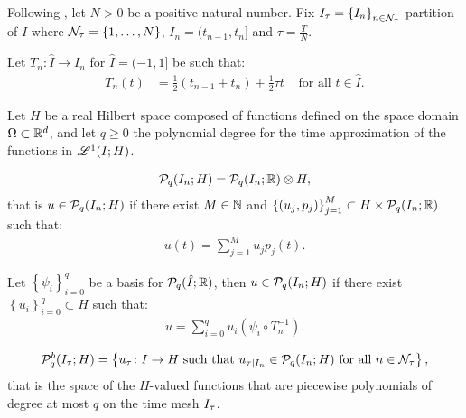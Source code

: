 Following \cite[p.~177]{Ern2021}, let $N > 0$ be a positive natural number. Fix $I_{\tau} = \left\{ I_n \right\}_{n \in \mathcal{N}_{\tau}}$ partition of $I$ where $\mathcal{N}_{\tau} = \left\{ 1, \dots, N \right\}$, $I_n = (t_{n - 1}, t_n]$ and $\tau = \frac{T}{N}$.

\begin{definition}[Mapping]
    Let $T_n \colon \hat{I} \rightarrow I_n$ for $\hat{I} = (-1, 1]$ be such that:
    \begin{align}
        T_n(t) &= \frac{1}{2}(t_{n - 1} + t_n) + \frac{1}{2} \tau t &\text{ for all } t \in \hat{I}.
    \end{align}
\end{definition}

Let $H$ be a real Hilbert space composed of functions defined on the space domain $\Omega \subset \mathbb{R}^{d}$, and let $q \geq 0$ the polynomial degree for the time approximation of the functions in $\mathscr{L}^{1}(I; H)$.

\begin{definition}[$\SpacePolynomials{q}(I_n; H)$]
    \begin{align}
        \mathcal{P}_{q}(I_n; H) = \mathcal{P}_{q}(I_n; \mathbb{R}) \otimes H,
    \end{align}
    that is $u \in \mathcal{P}_{q}(I_n; H)$ if there exist $M \in \mathbb{N}$ and $\left\{ (u_j, p_j) \right\}_{j = 1}^M \subset H \times \mathcal{P}_{q}(I_n; \mathbb{R})$ such that:
    \begin{align}
        u(t) = \sum_{j = 1}^M u_j p_j(t).
    \end{align}
\end{definition}

Let $\left\{ \psi_i \right\}_{i = 0}^q$ be a basis for $\mathcal{P}_{q}(\hat{I}; \mathbb{R})$, then $u \in \mathcal{P}_{q}(I_n; H)$ if there exist $\left\{ u_i \right\}_{i = 0}^q \subset H$ such that:
\begin{align} %
    u = \sum_{i = 0}^q u_i (\psi_i \circ T_n^{-1}).
\end{align}

\begin{definition}
    \begin{align}
        \mathcal{P}_{q}^b(I_{\tau}; H) = \left\{ u_{\tau} \colon I \rightarrow H \text{ such that } u_{\tau \mid I_n} \in \mathcal{P}_{q}(I_n; H) \text{ for all } n \in \mathcal{N}_{\tau} \right\},
    \end{align}
    that is the space of the $H$-valued functions that are piecewise polynomials of degree at most $q$ on the time mesh $I_{\tau}$.
\end{definition}


